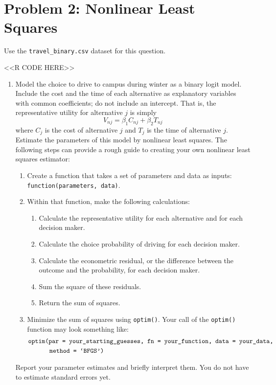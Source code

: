 \documentclass[11pt,letterpaper]{article}
\begin{document}
\section*{Problem 2: Nonlinear Least Squares}

Use the \texttt{travel\_binary.csv} dataset for this question.

<<R CODE HERE>>

\begin{enumerate}[label=\alph*., leftmargin=*]
	\item Model the choice to drive to campus during winter as a binary logit model. Include the cost and the time of each alternative as explanatory variables with common coefficients; do not include an intercept. That is, the representative utility for alternative $j$ is simply
	$$V_{nj} = \beta_1 C_{nj} + \beta_2 T_{nj}$$
	where $C_j$ is the cost of alternative $j$ and $T_j$ is the time of alternative $j$. Estimate the parameters of this model by nonlinear least squares. The following steps can provide a rough guide to creating your own nonlinear least squares estimator:
	\begin{enumerate}[label=\Roman*.]
		\item Create a function that takes a set of parameters and data as inputs: \texttt{function(parameters, data)}.
		\item Within that function, make the following calculations:
		\begin{enumerate}[label=\roman*.]
			\item Calculate the representative utility for each alternative and for each decision maker.
			\item Calculate the choice probability of driving for each decision maker.
			\item Calculate the econometric residual, or the difference between the outcome and the probability, for each decision maker.
			\item Sum the square of these residuals.
			\item Return the sum of squares.
		\end{enumerate}
		\item Minimize the sum of squares using \texttt{optim()}. Your call of the \texttt{optim()} function may look something like:
		\begin{align*}
			&\text{\texttt{optim(par = your\_starting\_guesses, fn = your\_function, data = your\_data,}} \\
			& \qquad \quad \; \text{\texttt{method = `BFGS')}}
		\end{align*}
	\end{enumerate}
	Report your parameter estimates and briefly interpret them. You do not have to estimate standard errors yet.


\end{enumerate}
\end{document}
